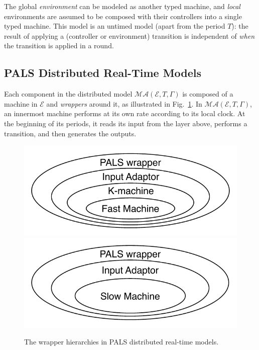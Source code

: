 
The global \emph{environment} can be modeled as another typed
machine, and \emph{local} environments are assumed to be composed with their
controllers into a single typed machine. 
This model is an untimed model (apart from the period $T$): 
the result of applying a (controller or environment) transition is 
independent of \emph{when}  the transition is applied in a round. 

\subsection{PALS Distributed  Real-Time Models}
\label{pals-dist}

Each component in the  distributed model $\mathcal{MA}(\mathcal{E}, T, \Gamma)$
is composed of a machine in $\mathcal{E}$ and \emph{wrappers} around it, as illustrated in Fig.~\ref{fig:wrappers}.
In $\mathcal{MA}(\mathcal{E}, T, \Gamma)$,
an innermost machine performs at its own rate according to its local clock.
At the beginning of its periods, it reads its input from the layer above, 
performs a transition, and then generates the outputs.

\begin{figure}
\centering
\includegraphics[width=0.49\columnwidth,clip=true,trim=0.3cm 0.3cm 0.3cm 0.3cm]{Onion-f.pdf}
\hfill
\includegraphics[width=0.49\columnwidth,clip=true,trim=0.3cm 0.3cm 0.3cm 0.3cm]{Onion-s.pdf}
\caption{The wrapper hierarchies %
in PALS distributed real-time  models.}
\label{fig:wrappers}
\end{figure}


